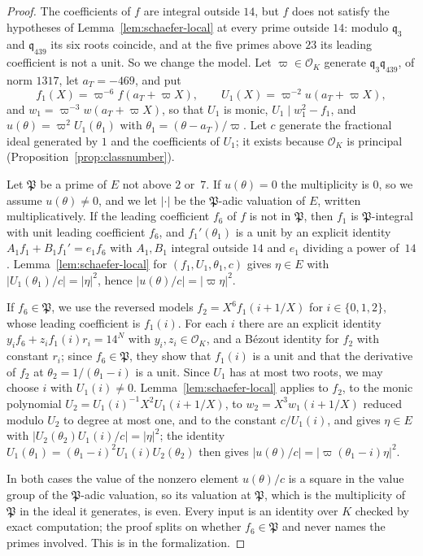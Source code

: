 \documentclass[11pt]{amsart}
\theoremstyle{definition}
\numberwithin{equation}{section}
\newcommand{\OK}{\mathcal{O}_K}
\begin{document}
\begin{proof}
The coefficients of $f$ are integral outside $14$, but $f$ does not satisfy the hypotheses of Lemma~\ref{lem:schaefer-local} at every prime outside $14$: modulo $\mathfrak q_3$ and $\mathfrak q_{439}$ its six roots coincide, and at the five primes above $23$ its leading coefficient is not a unit. So we change the model. Let $\varpi\in\OK$ generate $\mathfrak q_3\mathfrak q_{439}$, of norm $1317$, let $a_T=-469$, and put
\[
f_1(X)=\varpi^{-6}f(a_T+\varpi X),\qquad U_1(X)=\varpi^{-2}u(a_T+\varpi X),
\]
and $w_1=\varpi^{-3}w(a_T+\varpi X)$, so that $U_1$ is monic, $U_1\mid w_1^2-f_1$, and $u(\theta)=\varpi^2U_1(\theta_1)$ with $\theta_1=(\theta-a_T)/\varpi$. Let $c$ generate the fractional ideal generated by $1$ and the coefficients of $U_1$; it exists because $\OK$ is principal (Proposition~\ref{prop:classnumber}).

Let $\mathfrak P$ be a prime of $E$ not above $2$ or~$7$. If $u(\theta)=0$ the multiplicity is $0$, so we assume $u(\theta)\neq0$, and we let $|\cdot|$ be the $\mathfrak P$-adic valuation of $E$, written multiplicatively. If the leading coefficient $f_6$ of $f$ is not in $\mathfrak P$, then $f_1$ is $\mathfrak P$-integral with unit leading coefficient $f_6$, and $f_1'(\theta_1)$ is a unit by an explicit identity $A_1f_1+B_1f_1'=e_1f_6$ with $A_1,B_1$ integral outside $14$ and $e_1$ dividing a power of~$14$. Lemma~\ref{lem:schaefer-local} for $(f_1,U_1,\theta_1,c)$ gives $\eta\in E$ with $|U_1(\theta_1)/c|=|\eta|^2$, hence $|u(\theta)/c|=|\varpi\eta|^2$.

If $f_6\in\mathfrak P$, we use the reversed models $f_2=X^6f_1(i+1/X)$ for $i\in\{0,1,2\}$, whose leading coefficient is $f_1(i)$. For each $i$ there are an explicit identity $y_if_6+z_if_1(i)r_i=14^N$ with $y_i,z_i\in\OK$, and
 a B\'ezout identity for $f_2$ with constant $r_i$; since $f_6\in\mathfrak P$, they show that $f_1(i)$ is a unit and that the derivative of $f_2$ at $\theta_2=1/(\theta_1-i)$ is a unit. Since $U_1$ has at most two roots, we may choose $i$ with $U_1(i)\neq0$. Lemma~\ref{lem:schaefer-local} applies to $f_2$, to the monic polynomial $U_2=U_1(i)^{-1}X^2U_1(i+1/X)$, to $w_2=X^3w_1(i+1/X)$ reduced modulo $U_2$ to degree at most one, and to the constant $c/U_1(i)$, and gives $\eta\in E$ with $|U_2(\theta_2)U_1(i)/c|=|\eta|^2$; the identity $U_1(\theta_1)=(\theta_1-i)^2U_1(i)U_2(\theta_2)$ then gives $|u(\theta)/c|=|\varpi(\theta_1-i)\eta|^2$.

In both cases the value of the nonzero element $u(\theta)/c$ is a square in the value group of the $\mathfrak P$-adic valuation, so its valuation at $\mathfrak P$, which is the multiplicity of $\mathfrak P$ in the ideal it generates, is even. Every input is an identity over $K$ checked by exact computation; the proof splits on whether $f_6\in\mathfrak P$ and never names the primes involved. This is  in the formalization.
\end{proof}
\end{document}
